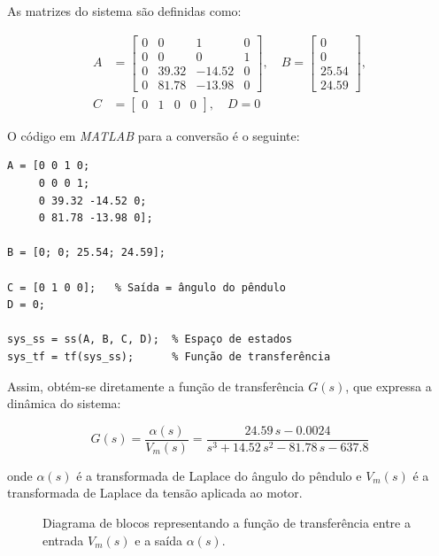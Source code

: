 \documentclass[9pt,a4paper,twocolumn,twoside]{tau-class/tau}
\begin{document}
As matrizes do sistema são definidas como:

\begin{equation}
\begin{split}
A &=
\begin{bmatrix}
0 & 0 & 1 & 0 \\
0 & 0 & 0 & 1 \\
0 & 39.32 & -14.52 & 0 \\
0 & 81.78 & -13.98 & 0
\end{bmatrix}, \quad
B =
\begin{bmatrix}
0 \\ 0 \\ 25.54 \\ 24.59
\end{bmatrix}, \\
C &= 
\begin{bmatrix}
0 & 1 & 0 & 0
\end{bmatrix}, \quad
D = 0
\end{split}
\end{equation}

O código em \textit{MATLAB} para a conversão é o seguinte:

\begin{verbatim}
A = [0 0 1 0;
     0 0 0 1;
     0 39.32 -14.52 0;
     0 81.78 -13.98 0];

B = [0; 0; 25.54; 24.59];

C = [0 1 0 0];   % Saída = ângulo do pêndulo
D = 0;

sys_ss = ss(A, B, C, D);  % Espaço de estados
sys_tf = tf(sys_ss);      % Função de transferência
\end{verbatim}

Assim, obtém-se diretamente a função de transferência $G(s)$, que expressa a 
dinâmica do sistema:

\begin{equation}
    G(s) = \frac{\alpha(s)}{V_m(s)}
          = \frac{24.59\,s - 0.0024}{s^3 + 14.52\,s^2 - 81.78\,s - 637.8}
\end{equation}

onde $\alpha(s)$ é a transformada de Laplace do ângulo do pêndulo e $V_m(s)$ é a 
transformada de Laplace da tensão aplicada ao motor.


\begin{figure}[H]
    \centering
    \caption{Diagrama de blocos representando a função de transferência entre a entrada $V_m(s)$ e a saída $\alpha(s)$.}
    \label{fig:tf_pendulo}
\end{figure}
\end{document}

